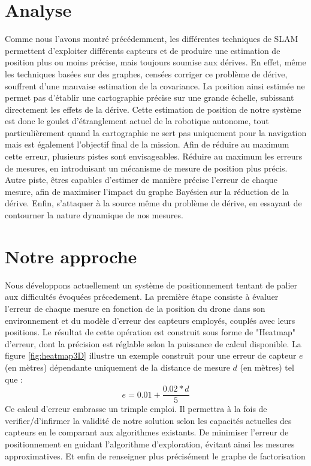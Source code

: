 \documentclass[twoside,twocolumn]{article}
\begin{document}

\section{Analyse}
Comme nous l'avons montré précédemment, les différentes techniques de SLAM permettent d'exploiter différents capteurs et de produire une estimation de position plus
ou moins précise, mais toujours soumise aux dérives. En effet, même les techniques basées sur des graphes, censées corriger ce problème de dérive,
souffrent d'une mauvaise estimation de la covariance. La position ainsi estimée ne permet pas d'établir une cartographie précise sur une grande échelle,
subissant directement les effets de la dérive. Cette estimation de position de notre système est donc le goulet d'étranglement actuel de la robotique autonome,
tout particulièrement quand la cartographie ne sert pas uniquement pour la navigation mais est également l'objectif final de la mission. Afin de réduire au maximum
cette erreur, plusieurs pistes sont envisageables. Réduire au maximum les erreurs de mesures, en introduisant un mécanisme de mesure de position plus précis. Autre piste,
êtres capables d'estimer de manière précise l'erreur de chaque mesure, afin de maximiser l'impact du graphe Bayésien sur la réduction de la dérive.
Enfin, s'attaquer à la source même du problème de dérive, en essayant de contourner la nature dynamique de nos mesures.

\section{Notre approche}
Nous développons actuellement un système de positionnement tentant de palier aux difficultés évoquées précedement. La première étape consiste à évaluer
l'erreur de chaque mesure en fonction de la position du drone dans son environnement et du modèle d'erreur des capteurs employés, couplés avec leurs positions. Le résultat de cette opération
est construit sous forme de "Heatmap" d'erreur, dont la précision est réglable selon la puissance de calcul disponible. La figure \ref{fig:heatmap3D} illustre un exemple construit pour une
erreur de capteur $e$ (en mètres) dépendante uniquement de la distance de mesure $d$ (en mètres) tel que :
\begin{equation} e = 0.01 + \frac{0.02*d}{5} \end{equation}
Ce calcul d'erreur embrasse un trimple emploi. Il permettra à la fois de verifier/d'infirmer la validité de notre solution
selon les capacités actuelles des capteurs en le comparant aux algorithmes existants. De minimiser l'erreur de positionnement
en guidant l'algorithme d'exploration, évitant ainsi les mesures approximatives. Et enfin de renseigner plus précisément le graphe de factorisation
\end{document}
